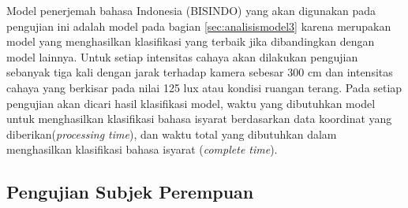 Model penerjemah bahasa Indonesia (BISINDO) yang akan digunakan pada pengujian ini adalah model pada bagian \ref{sec:analisismodel3} karena merupakan model yang menghasilkan klasifikasi yang terbaik jika dibandingkan dengan model lainnya. Untuk setiap intensitas cahaya akan dilakukan pengujian sebanyak tiga kali dengan jarak terhadap kamera sebesar 300 cm dan intensitas cahaya yang berkisar pada nilai 125 lux atau kondisi ruangan terang. Pada setiap pengujian akan dicari hasil klasifikasi model, waktu yang dibutuhkan model untuk menghasilkan klasifikasi bahasa isyarat berdasarkan data koordinat yang diberikan(\emph{processing time}), dan waktu total yang dibutuhkan dalam menghasilkan klasifikasi bahasa isyarat (\emph{complete time}).  

\subsection{Pengujian Subjek Perempuan}
\label{sec:analisisperempuan}

